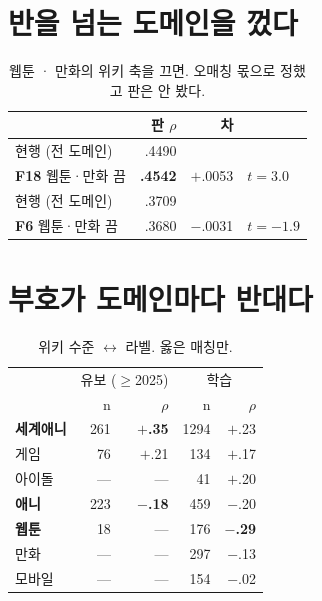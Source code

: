 \documentclass[10pt]{article}
\begin{document}
\section{반을 넘는 도메인을 껐다}

\begin{table}[t]
\centering\tsize
\caption{웹툰 · 만화의 위키 축을 끄면. 오매칭 몫으로 정했고 판은 안 봤다.}
\begin{tabular}{lrrl}
\toprule
& 판 $\rho$ & 차 & \\
\midrule
현행 (전 도메인) & .4490 & & \\
\textbf{F18} 웹툰·만화 끔 & \textbf{.4542} & $+$.0053 & \textbf{$t{=}3.0$} \\
\midrule
현행 (전 도메인) & .3709 & & \\
\textbf{F6} 웹툰·만화 끔 & .3680 & $-$.0031 & \textbf{$t{=}-1.9$} \\
\bottomrule
\end{tabular}
\end{table}


\section{부호가 도메인마다 반대다}

\begin{table}[t]
\centering\tsize
\caption{위키 수준 $\leftrightarrow$ 라벨. 옳은 매칭만.}
\begin{tabular}{lrrrr}
\toprule
& \multicolumn{2}{c}{유보 ($\ge$2025)} & \multicolumn{2}{c}{학습} \\
& n & $\rho$ & n & $\rho$ \\
\midrule
\textbf{세계애니} & 261 & \textbf{$+$.35} & 1294 & $+$.23 \\
게임 & 76 & $+$.21 & 134 & $+$.17 \\
아이돌 & --- & --- & 41 & $+$.20 \\
\midrule
\textbf{애니} & 223 & \textbf{$-$.18} & 459 & $-$.20 \\
\textbf{웹툰} & 18 & --- & 176 & \textbf{$-$.29} \\
만화 & --- & --- & 297 & $-$.13 \\
모바일 & --- & --- & 154 & $-$.02 \\
\bottomrule
\end{tabular}
\end{table}
\end{document}
